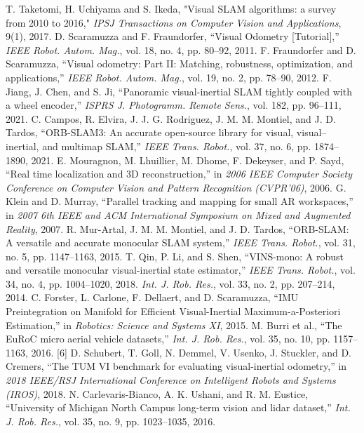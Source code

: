 \documentclass[letterpaper, 10 pt, conference]{ieeeconf}  %
\begin{document}
\begin{thebibliography}{99}
 T. Taketomi, H. Uchiyama and S. Ikeda, "Visual SLAM algorithms: a survey from 2010 to 2016," \textit{IPSJ Transactions on Computer Vision and Applications}, 9(1), 2017.
 D. Scaramuzza and F. Fraundorfer, “Visual Odometry [Tutorial],” \textit{IEEE Robot. Autom. Mag.}, vol. 18, no. 4, pp. 80–92, 2011.
 F. Fraundorfer and D. Scaramuzza, “Visual odometry: Part II: Matching, robustness, optimization, and applications,” \textit{IEEE Robot. Autom. Mag.}, vol. 19, no. 2, pp. 78–90, 2012.
 F. Jiang, J. Chen, and S. Ji, “Panoramic visual-inertial SLAM tightly coupled with a wheel encoder,” \textit{ISPRS J. Photogramm. Remote Sens.}, vol. 182, pp. 96–111, 2021.
	C. Campos, R. Elvira, J. J. G. Rodriguez, J. M. M. Montiel, and J. D. Tardos, “ORB-SLAM3: An accurate open-source library for visual, visual–inertial, and multimap SLAM,” \textit{IEEE Trans. Robot.}, vol. 37, no. 6, pp. 1874–1890, 2021.
 E. Mouragnon, M. Lhuillier, M. Dhome, F. Dekeyser, and P. Sayd, “Real time localization and 3D reconstruction,” in \textit{2006 IEEE Computer Society Conference on Computer Vision and Pattern Recognition (CVPR’06)}, 2006.
 G. Klein and D. Murray, “Parallel tracking and mapping for small AR workspaces,” in \textit{2007 6th IEEE and ACM International Symposium on Mixed and Augmented Reality}, 2007.
 R. Mur-Artal, J. M. M. Montiel, and J. D. Tardos, “ORB-SLAM: A versatile and accurate monocular SLAM system,” \textit{IEEE Trans. Robot.}, vol. 31, no. 5, pp. 1147–1163, 2015.
 T. Qin, P. Li, and S. Shen, “VINS-mono: A robust and versatile monocular visual-inertial state estimator,” \textit{IEEE Trans. Robot.}, vol. 34, no. 4, pp. 1004–1020, 2018.
\textit{Int. J. Rob. Res.}, vol. 33, no. 2, pp. 207–214, 2014.
 C. Forster, L. Carlone, F. Dellaert, and D. Scaramuzza, “IMU Preintegration on Manifold for Efficient Visual-Inertial Maximum-a-Posteriori Estimation,” in  \textit{Robotics: Science and Systems XI}, 2015.
 M. Burri et al., “The EuRoC micro aerial vehicle datasets,” \textit{Int. J. Rob. Res.}, vol. 35, no. 10, pp. 1157–1163, 2016.
 [6]	D. Schubert, T. Goll, N. Demmel, V. Usenko, J. Stuckler, and D. Cremers, “The TUM VI benchmark for evaluating visual-inertial odometry,” in \textit{2018 IEEE/RSJ International Conference on Intelligent Robots and Systems (IROS)}, 2018.
	N. Carlevaris-Bianco, A. K. Ushani, and R. M. Eustice, “University of Michigan North Campus long-term vision and lidar dataset,” \textit{Int. J. Rob. Res.}, vol. 35, no. 9, pp. 1023–1035, 2016.

\end{thebibliography}
\end{document}
